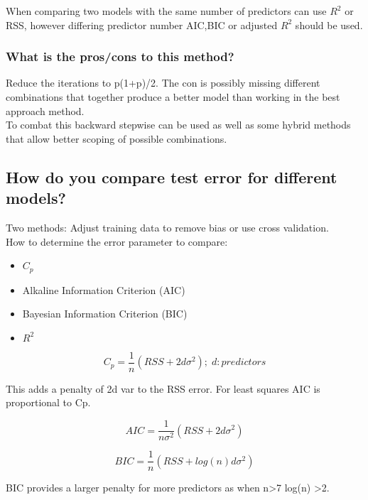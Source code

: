 \documentclass[11pt]{scrartcl} %
\begin{document}
When comparing two models with the same number of predictors can use \(R^2\) or RSS, however differing
predictor number AIC,BIC or adjusted \(R^2\) should be used.

\subsubsection{What is the pros/cons to this method?}

Reduce the iterations to p(1+p)/2. The con is possibly missing different combinations that together
produce a better model than working in the best approach method.\\

To combat this backward stepwise can be used as well as some hybrid methods that allow better scoping of
possible combinations.

\subsection{How do you compare test error for different models?}

Two methods: Adjust training data to remove bias or use cross validation.\\

How to determine the error parameter to compare:

\begin{itemize}
	\item \(C_p\)
	\item Alkaline Information Criterion (AIC)
	\item Bayesian Information Criterion (BIC)
	\item \(R^2\)
\end{itemize}

\begin{equation}
	C_p = \frac{1}{n}(RSS+2d\sigma^2);\; d:predictors
\end{equation}

This adds a penalty of 2d var to the RSS error. For least squares AIC is proportional to Cp.

\begin{equation}
	AIC = \frac{1}{n\sigma^2}(RSS+2d\sigma^2)
\end{equation}

\begin{equation}
	BIC = \frac{1}{n}(RSS + log(n)d\sigma^2)
\end{equation}

BIC provides a larger penalty for more predictors as when n>7 log(n) >2.
\end{document}
